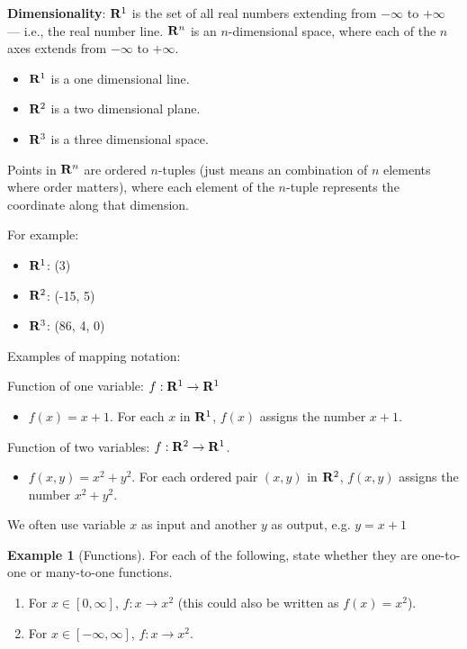 \documentclass[]{book}
\providecommand{\tightlist}{%
  \setlength{\itemsep}{0pt}\setlength{\parskip}{0pt}}
\theoremstyle{definition}
\theoremstyle{definition}
\newtheorem{example}{Example}[chapter]
\theoremstyle{definition}
\theoremstyle{remark}
\begin{document}
\textbf{Dimensionality}: \({\bf R}^1\) is the set of all real numbers extending from \(-\infty\) to \(+\infty\) --- i.e., the real number line. \({\bf R}^n\) is an \(n\)-dimensional space, where each of the \(n\) axes extends from \(-\infty\) to \(+\infty\).

\begin{itemize}
\tightlist
\item
  \({\bf R}^1\) is a one dimensional line.
\item
  \({\bf R}^2\) is a two dimensional plane.
\item
  \({\bf R}^3\) is a three dimensional space.
\end{itemize}

Points in \({\bf R}^n\) are ordered \(n\)-tuples (just means an combination of \(n\) elements where order matters), where each element of the \(n\)-tuple represents the coordinate along that dimension.

For example:

\begin{itemize}
\tightlist
\item
  \({\bf R}^1\): (3)
\item
  \({\bf R}^2\): (-15, 5)
\item
  \({\bf R}^3\): (86, 4, 0)
\end{itemize}

Examples of mapping notation:

Function of one variable: \(f:{\bf R}^1\to{\bf R}^1\)

\begin{itemize}
\tightlist
\item
  \(f(x)=x+1\). For each \(x\) in \({\bf R}^1\), \(f(x)\) assigns the number \(x+1\).
\end{itemize}

Function of two variables: \(f: {\bf R}^2\to{\bf R}^1\).

\begin{itemize}
\tightlist
\item
  \(f(x,y)=x^2+y^2\). For each ordered pair \((x,y)\) in \({\bf R}^2\), \(f(x,y)\) assigns the number \(x^2+y^2\).
\end{itemize}

We often use variable \(x\) as input and another \(y\) as output, e.g. \(y=x+1\)

\begin{example}[Functions]
\protect\hypertarget{exm:functions}{}{\label{exm:functions} {} }
For each of the following, state whether they are one-to-one or many-to-one functions.

\begin{enumerate}
\def\labelenumi{\arabic{enumi}.}
\item
  For \(x \in [0,\infty]\), \(f : x \rightarrow x^2\) (this could also be written as \(f(x) = x^2\)).
\item
  For \(x \in [-\infty, \infty]\), \(f: x \rightarrow x^2\).
\end{enumerate}
\end{example}
\end{document}
